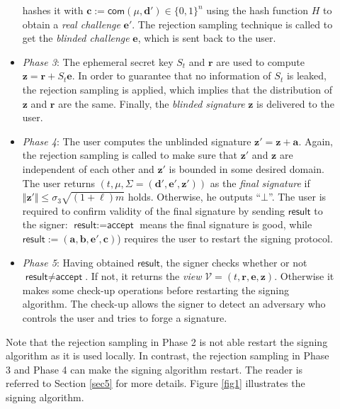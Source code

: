 \documentclass[runningheads]{llncs}
\def\bf{\mathbf}
\begin{document}
\begin{description}
\begin{itemize}
		hashes it with $\bf{c}:=\mathsf{com}(\mu, \mathbf{d}') \in \{0,1\}^n$ 
		using the hash function $H$ to obtain a \textit{real challenge} $\mathbf{e}'$. 
		The rejection sampling technique is called
		 to get the \textit{blinded challenge} $\mathbf{e}$, which is sent back to the user. 
	\item \textit{Phase 3}: 
		The ephemeral secret key $S_t$ and $\textbf{r}$ are used to compute $\mathbf{z}=\mathbf{r}+S_t \mathbf{e}$. 
		In order to guarantee that no information of $S_t$ is leaked, 
		the rejection sampling is applied, which implies that
		the distribution of $\mathbf{z}$ and $\mathbf{r}$ are the same. 
		Finally, the \textit{blinded signature}  $\mathbf{z}$ is delivered to the user. 
	\item \textit{Phase 4}:  The user computes the unblinded signature $\mathbf{z}'=\mathbf{z}+\mathbf{a}$. 
		Again, the rejection sampling is called to make sure that $\mathbf{z}'$ and $\mathbf{z}$ 
		are independent of each other and $\mathbf{z}'$ is bounded in some desired domain.
		The user returns $(t,\mu, \Sigma=( \mathbf{d}', \mathbf{e}', \mathbf{z}'))$ as the \textit{final signature} 
		if $\Vert \mathbf{z}' \Vert \leq  \sigma_3\sqrt{(1+\ell)m} $ holds. Otherwise, he outputs ``$\bot$''. 
		The user is required to confirm validity of the final signature by sending $\textsf{result}$ 
	 	to the signer: $\textsf{result}:=\textsf{accept}$ means the final signature is good, 
		while $ \textsf{result}:=(\mathbf{a}, \mathbf{b}, \mathbf{e}', \bf{c})$) requires the user to
		restart the signing protocol.   	
	\item \textit{Phase 5}: Having obtained  
		$\textsf{result}$, the signer checks whether or not $\textsf{result}\neq \textsf{accept}$. 
		If not, it returns the \textit{view}  $\mathcal{V}=(t,\mathbf{r},\mathbf{e}, \mathbf{z})$.
		Otherwise it makes some check-up operations before restarting the signing algorithm. 
		The check-up allows the signer to detect an adversary who controls the user and tries to
		forge a signature.
	\end{itemize} 
Note that the rejection sampling in Phase 2 is not able restart the signing algorithm as it is used locally. 
In contrast, the rejection sampling in Phase 3 and Phase 4 can make the signing algorithm restart. 
The reader is referred  to Section \ref{sec5} for more details. 
Figure \ref{fig1} illustrates the signing algorithm.
		\begin{figure*}[h]
		\centering
		\medskip
		\smallskip
		\raisebox{\dimexpr 0.6\baselineskip-\height}%
		

\end{figure*}
\end{description}
\end{document}
